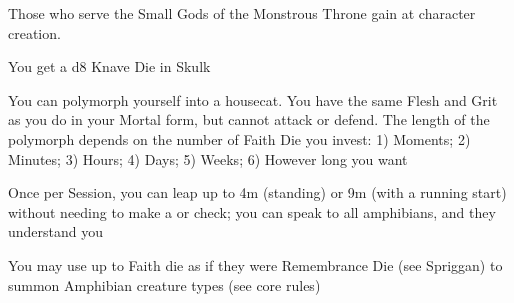 {\newpage






Those who serve the Small Gods of the Monstrous Throne gain \DCUP \VIG at character creation.








\GOD[
Name=Bast,
Link=small-god-bast,
GodOf=Archon of Cats,
Holy=a small bell without a clapper worn on a choker
]


You get a d8 Knave Die in Skulk


You can polymorph yourself into a housecat.  You have the same Flesh and Grit as you do in your Mortal form, but cannot attack or defend.  The length of the polymorph depends on the number of Faith Die you invest:  1) Moments; 2) Minutes; 3) Hours; 4) Days; 5) Weeks; 6) However long you want




\GOD[
Name=Bobugbubilz,
Link=small-god-bobugbubilz,
GodOf=the Croaking Fane,
Holy=3 dessicated frogs worn from the belt or neck
]


Once per Session, you can leap up to 4m (standing) or 9m (with a running start) without needing to make a \VIG or \DEX check; you can speak to all amphibians, and they understand you


You may use up to \LVL Faith die as if they were Remembrance Die (see Spriggan) to summon Amphibian creature types (see core rules)




\GOD[
Name=Hhaaashh-Lusss,
Link=small-god-hhaaashh-lusss,
GodOf=Princess of Reptiles,
Holy=snakeskin bracers
]

}
